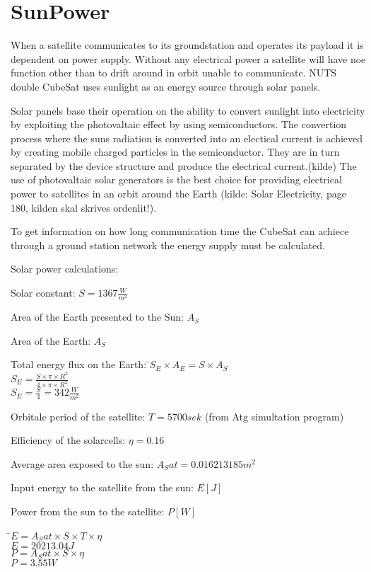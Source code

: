 \section{SunPower}

When a satellite communicates to its groundstation and operates its payload it is dependent on power supply. Without any electrical power a satellite will have noe function other than to drift around in orbit unable to communicate. NUTS double CubeSat uses sunlight as an energy source through solar panels. 

Solar panels base their operation on the ability to convert sunlight into electricity by exploiting the photovaltaic effect by using semiconductors. The convertion process where the suns radiation is converted into an electical current is achieved by creating mobile charged particles in the semiconductor. They are in turn separated by the device structure and produce the electrical current.(kilde) The use of photovaltaic solar generators is the best choice for providing electrical power to satellites in an orbit around the Earth (kilde: Solar Electricity, page 180, kilden skal skrives ordenlit!).

To get information on how long communication time the CubeSat can achiece through a ground station network the energy supply must be calculated.


Solar power calculations:


Solar constant: $S = 1367 \frac{W}{m^2}$

Area of the Earth presented to the Sun: $A_S$ 

Area of the Earth: $A_S$

\begin{tabbing}
Total energy flux on the Earth: \=\boldmath$S_E\times A_E = S\times A_S$\\


						\>$S_E = \frac{S\times \pi\times R^2}{4\times \pi\times R^2}$\\


						\>$S_E = \frac{S}{4} = 342\frac{W}{m^2}$\\
\end{tabbing}

Orbitale period of the satellite: $T = 5700sek$ (from Atg simultation program)

Efficiency of the solarcells: $\eta = 0.16$

Average area exposed to the sun: $A_Sat = 0.016213185 m^2$

Input energy to the satellite from the sun: $E [J]$

Power from the sun to the satellite: $P [W]$
				
\begin{tabbing}
						 \=\boldmath$E = A_Sat\times S\times T\times \eta$\\
						\>$E = 20213.04  J$\\
						\>\boldmath$P = A_Sat\times S\times \eta$\\
						\>$P = 3.55 W$\\
\end{tabbing}

